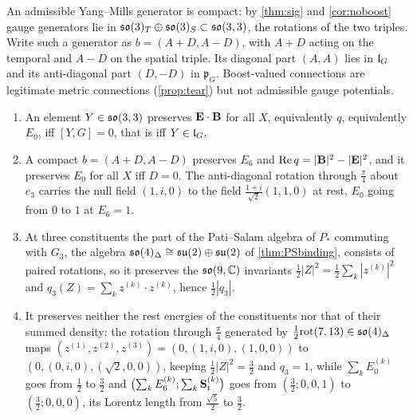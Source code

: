 An admissible Yang--Mills generator is compact: by \cref{thm:sig} and \cref{cor:noboost} gauge generators lie in $\mathfrak{so}(3)_T\oplus\mathfrak{so}(3)_S\subset\mathfrak{so}(3,3)$,
the rotations of the two triples. Write such a generator as $b=(A+D,A-D)$, with $A+D$ acting on the temporal and $A-D$ on the spatial triple. Its
diagonal part $(A,A)$ lies in $\mathfrak l_G$ and its anti-diagonal part $(D,-D)$ in $\mathfrak p_G$. Boost-valued connections are legitimate metric
connections (\cref{prop:tear}) but not admissible gauge potentials.

\begin{proposition}
\label{en:transport}
\begin{enumerate}[label=(\roman*),leftmargin=2.2em]
\item An element $Y\in\mathfrak{so}(3,3)$ preserves $\mathbf E\cdot\mathbf B$ for all $X$, equivalently $q$, equivalently $E_0$, iff $[Y,G]=0$, that is iff $Y\in\mathfrak l_G$.
\item A compact $b=(A+D,A-D)$ preserves $E_6$ and $\operatorname{Re} q=|\mathbf B|^2-|\mathbf E|^2$, and it preserves $E_0$ for all $X$ iff $D=0$. The anti-diagonal
rotation through $\tfrac\pi4$ about $e_3$ carries the null field $(1,i,0)$ to the field $\tfrac{1+i}{\sqrt2}(1,1,0)$ at rest, $E_0$ going from $0$ to $1$
at $E_6=1$.
\item At three constituents the part of the Pati--Salam algebra of $P_*$ commuting with $G_3$, the algebra $\mathfrak{so}(4)_\Delta\cong\mathfrak{su}(2)\oplus\mathfrak{su}(2)$ of
\cref{thm:PSbinding}, consists of paired rotations, so it preserves the $\mathfrak{so}(9,\mathbb{C})$ invariants $\tfrac12|Z|^2=\tfrac12\sum_k|z^{(k)}|^2$ and
$q_3(Z)=\sum_kz^{(k)}\cdot z^{(k)}$, hence $\tfrac12|q_3|$.
\item It preserves neither the rest energies of the constituents nor that of their summed density: the rotation through $\tfrac\pi4$ generated by
$\tfrac12\mathrm{rot}(7,13)\in\mathfrak{so}(4)_\Delta$ maps $(z^{(1)},z^{(2)},z^{(3)})=(0,(1,i,0),(1,0,0))$ to $(0,(0,i,0),(\sqrt2,0,0))$, keeping
$\tfrac12|Z|^2=\tfrac32$ and $q_3=1$, while $\sum_kE_0^{(k)}$ goes from $\tfrac12$ to $\tfrac32$ and
$\bigl(\sum_kE_6^{(k)};\sum_k\mathbf S_{\rm t}^{(k)}\bigr)$ goes from $(\tfrac32;0,0,1)$ to $(\tfrac32;0,0,0)$, its Lorentz length from $\tfrac{\sqrt5}2$
to $\tfrac32$.
\end{enumerate}
\end{proposition}

